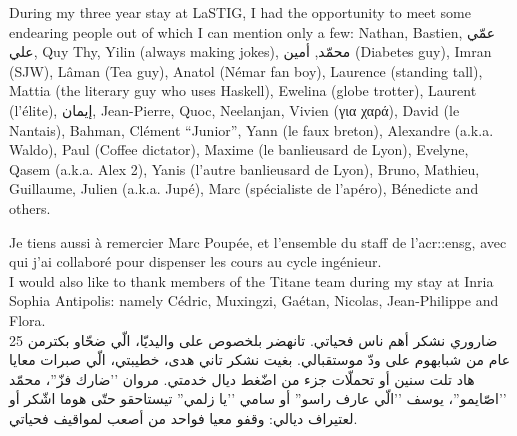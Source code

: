 During my three year stay at LaSTIG, I had the opportunity to meet some endearing people out of which I can mention only a few: Nathan, Bastien, \foreignlanguage{arabic}{عمّي علي}, Quy Thy, Yilin (always making jokes), \foreignlanguage{arabic}{محمّد}, \foreignlanguage{arabic}{أمين} (Diabetes guy), Imran (SJW), Lâman (Tea guy), Anatol (Némar fan boy), Laurence (standing tall), Mattia (the literary guy who uses Haskell), Ewelina (globe trotter), Laurent (l'élite), \foreignlanguage{arabic}{إيمان}, Jean-Pierre, Quoc, Neelanjan, Vivien (\foreignlanguage{greek}{για χαρά}), David (le Nantais), Bahman, Clément ``Junior'', Yann (le faux breton), Alexandre (a.k.a. Waldo), Paul (Coffee dictator), Maxime (le banlieusard de Lyon), Evelyne, Qasem (a.k.a. Alex 2), Yanis (l'autre banlieusard de Lyon), Bruno, Mathieu, Guillaume, Julien (a.k.a. Jupé), Marc (spécialiste de l'apéro), Bénedicte and others.

Je tiens aussi à remercier Marc Poupée, et l'ensemble du staff de l'\acrshort*{acr::ensg}, avec qui j'ai collaboré pour dispenser les cours au cycle ingénieur.\\

I would also like to thank members of the Titane team during my stay at Inria Sophia Antipolis: namely Cédric, Muxingzi, Gaétan, Nicolas, Jean-Philippe and Flora.\\

ضاروري نشكر أهم ناس فحياتي.
تانهضر بلخصوص على واليديّا، الّي ضحّاو بكترمن 25 عام من شبابهوم على ودّ موستقبالي.
بغيت نشكر تاني هدى، خطيبتي، الّي صبرات معايا هاد تلت سنين أو تحملّات جزء من اضّغط ديال خدمتي.
مروان ’’ضارك فزّ''، محمّد ’’اصّايمو''، يوسف ’’الّي عارف راسو'' أو سامي ’’يا زلمي'' تيستاحقو حتّى هوما اشّكر أو لعتيراف ديالي: وقفو معيا فواحد من أصعب لمواقيف فحياتي.
